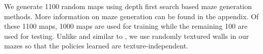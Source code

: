 We generate 1100 random maps using depth first search based maze generation methods. More information on maze generation can be found in the appendix. 
Of these 1100 maps, 1000 maps are used for training while the remaining 100 are used for testing.
Unlike \cite{MiPaViICLR2017} and similar to \cite{ChLaSaNIPS2016}, we use randomly textured walls in our mazes so that the policies learned are texture-independent.







